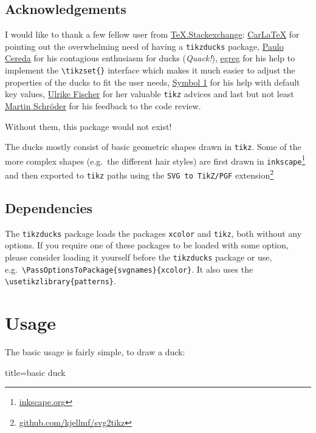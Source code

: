 \documentclass{scrartcl}
\begin{document}
\subsection{Acknowledgements}

I would like to thank a few fellow user from \href{https://tex.stackexchange.com/}{TeX.Stackexchange}: \href{https://tex.stackexchange.com/users/101651/carlatex}{CarLaTeX} for pointing out the overwhelming need of having a \verb|tikzducks| package,
\href{https://tex.stackexchange.com/users/3094/paulo-cereda}{Paulo Cereda} for his contagious enthusiasm for ducks (\emph{Quack!}),
\href{https://tex.stackexchange.com/users/4427/egreg}{egreg} for his help to implement the \verb|\tikzset{}| interface which makes it much easier to adjust the properties of the ducks to fit the user needs, \href{https://tex.stackexchange.com/users/51022/symbol-1}{Symbol 1} for his help with default key values, \href{https://tex.stackexchange.com/users/2388/ulrike-fischer}{Ulrike Fischer} for her valuable \verb|tikz| advices and last but not least \href{https://tex.stackexchange.com/users/5763/martin-schr%c3%b6der}{Martin Schr\"oder} for his feedback to the code review.

\bigskip\noindent
Without them, this package would not exist!

The ducks mostly consist of basic geometric shapes drawn in \verb|tikz|. Some of the more complex shapes (e.g.\ the different hair styles) are first drawn in \verb|inkscape|\footnote{\url{inkscape.org}} and then exported to \verb|tikz| paths using the \verb|SVG to TikZ/PGF| extension\footnote{\url{github.com/kjellmf/svg2tikz}}

\subsection{Dependencies}

The \verb|tikzducks| package loads the packages \verb|xcolor| and \verb|tikz|, both without any options. If you require one of these packages to be loaded with some option, please consider loading it yourself before the \verb|tikzducks| package or use, e.g.\ \verb|\PassOptionsToPackage{svgnames}{xcolor}|.
It also uses the \verb|\usetikzlibrary{patterns}|.

\section{Usage}

The basic usage is fairly simple, to draw a duck:
\begin{tcblisting}{title={basic duck}}
\begin{tikzpicture}
	\duck
\end{tikzpicture}
\end{tcblisting}
\end{document}
